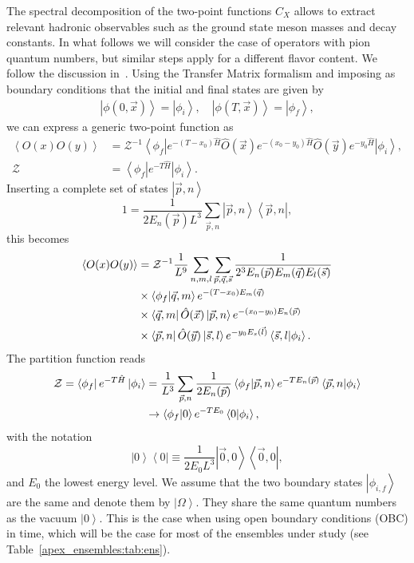 The spectral decomposition of the two-point functions $C_X$ allows to extract relevant hadronic observables such as the ground state meson masses and decay constants. In what follows we will consider the case of operators with pion quantum numbers, but similar steps apply for a different flavor content. We follow the discussion in~\citep{hep-lat/9903040,Bruno:2015hfq}. Using the Transfer Matrix formalism and imposing as boundary conditions that the initial and final states are given by
\begin{gather}
\left|\phi(0,\vec{x})\right>=\left|\phi_i\right>, \quad \left|\phi(T,\vec{x})\right>=\left|\phi_f\right>,
\end{gather}
we can express a generic two-point function as
\begin{align}
\label{ch_observables:eq:spectral}
\left<O(x)O(y)\right>&=\mathcal{Z}^{-1}\left<\phi_f\right|e^{-(T-x_0)\hat{H}}\hat{O}(\vec{x})e^{-(x_0-y_0)\hat{H}}\hat{O}(\vec{y})e^{-y_0\hat{H}}\left|\phi_i\right>, \\
\mathcal{Z}&=\left<\phi_f\right|e^{-T\hat{H}}\left|\phi_i\right>.
\end{align}
Inserting a complete set of states $\left|\vec{p},n\right>$
\begin{equation}
1=\frac{1}{2E_n(\vec{p})L^3}\sum_{\vec{p},n}\left|\vec{p},n\right>\left<\vec{p},n\right|,
\end{equation}
this becomes
\begin{align}
\left<O(x)O(y)\right>&=\mathcal{Z}^{-1}\frac{1}{L^9}\sum_{n,m,l}\sum_{\vec{p},\vec{q},\vec{s}}\frac{1}{2^3E_n(\vec{p})E_m(\vec{q})E_l(\vec{s})} \notag \\
&\times\left<\phi_f|\vec{q},m\right>e^{-(T-x_0)E_m(\vec{q})} \notag \\
&\times\left<\vec{q},m\right|\hat{O}(\vec{x})\left|\vec{p},n\right>e^{-(x_0-y_0)E_n(\vec{p})} \notag \\
&\times\left<\vec{p},n\right|\hat{O}(\vec{y})\left|\vec{s},l\right>e^{-y_0E_s(\vec{l})}\left<\vec{s},l|\phi_i\right>. 
\end{align}
The partition function reads
\begin{align}
\mathcal{Z}=\left<\phi_f\right|e^{-T\hat{H}}\left|\phi_i\right>&=\frac{1}{L^3}\sum_{\vec{p},n}\frac{1}{2E_n(\vec{p})}\left<\phi_f|\vec{p},n\right>e^{-TE_n(\vec{p})}\left<\vec{p},n|\phi_i\right> \notag \\
&\rightarrow\left<\phi_f|0\right>e^{-TE_0}\left<0|\phi_i\right>,
\end{align}
with the notation
\begin{equation}
\left|0\right>\left<0\right|\equiv\frac{1}{2E_0L^3}\left|\vec{0},0\right>\left<\vec{0},0\right|,
\end{equation}
and $E_0$ the lowest energy level. We assume that the two boundary states $\left|\phi_{i,f}\right>$ are the same and denote them by $\left|\Omega\right>$. They share the same quantum numbers as the vacuum $\left|0\right>$. This is the case when using open boundary conditions (OBC) in time, which will be the case for most of the ensembles under study (see Table~\ref{apex_ensembles:tab:ens}).

